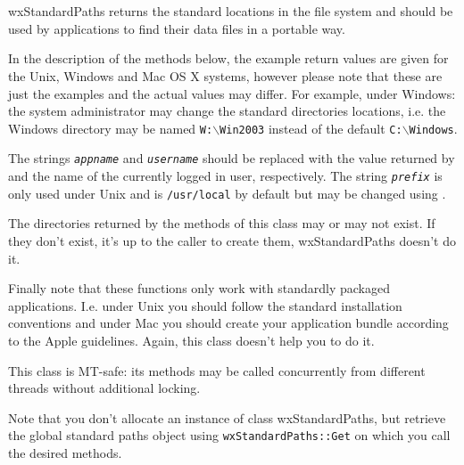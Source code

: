 
\section{}\label{wxstandardpaths}

wxStandardPaths returns the standard locations in the file system and should be
used by applications to find their data files in a portable way.

In the description of the methods below, the example return values are given
for the Unix, Windows and Mac OS X systems, however please note that these are
just the examples and the actual values may differ. For example, under Windows:
the system administrator may change the standard directories locations, i.e.
the Windows directory may be named \texttt{W:$\backslash$Win2003} instead of
the default \texttt{C:$\backslash$Windows}.

The strings \texttt{\textit{appname}} and \texttt{\textit{username}} should be
replaced with the value returned by 
and the name of the currently logged in user, respectively. The string
\texttt{\textit{prefix}} is only used under Unix and is \texttt{/usr/local} by
default but may be changed using .

The directories returned by the methods of this class may or may not exist. If
they don't exist, it's up to the caller to create them, wxStandardPaths doesn't
do it.

Finally note that these functions only work with standardly packaged
applications. I.e. under Unix you should follow the standard installation
conventions and under Mac you should create your application bundle according
to the Apple guidelines. Again, this class doesn't help you to do it.

This class is MT-safe: its methods may be called concurrently from different
threads without additional locking.

Note that you don't allocate an instance of class wxStandardPaths, but retrieve the 
global standard paths object using \texttt{wxStandardPaths::Get} on which you call the 
desired methods.

